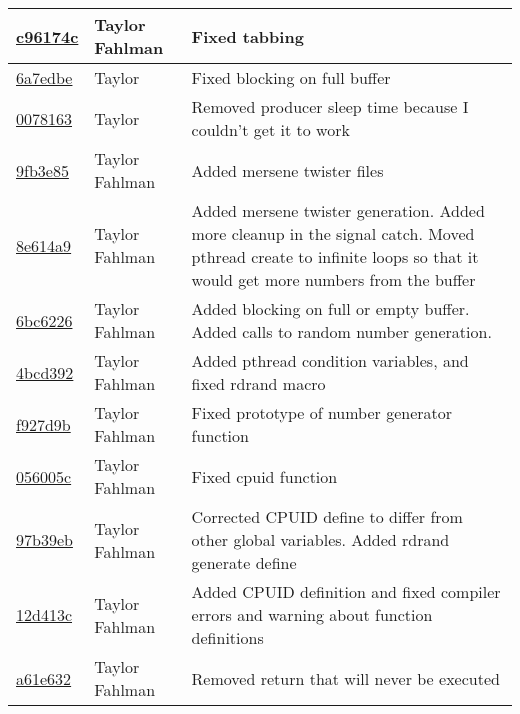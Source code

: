 \begin{tabular}{l l l}
\href{git@github.com:fahlmant/cs444/commit/c96174c136e9194fd83f4d5fee5927432468fdfd}{c96174c} & Taylor Fahlman & Fixed tabbing\\\hline
\href{git@github.com:fahlmant/cs444/commit/6a7edbe421fb5e53a9a847a09117500c1ca1482e}{6a7edbe} & Taylor & Fixed blocking on full buffer\\\hline
\href{git@github.com:fahlmant/cs444/commit/007816390983ac7d562e8f9d4d31ff6abc7c40c8}{0078163} & Taylor & Removed producer sleep time because I couldn't get it to work\\\hline
\href{git@github.com:fahlmant/cs444/commit/9fb3e850a20f58cd174a80bf580c150ebb8a8860}{9fb3e85} & Taylor Fahlman & Added mersene twister files\\\hline
\href{git@github.com:fahlmant/cs444/commit/8e614a90d9b3adfedea1214253801c36f17c6aea}{8e614a9} & Taylor Fahlman & Added mersene twister generation. Added more cleanup in the signal catch. Moved pthread create to infinite loops so that it would get more numbers from the buffer\\\hline
\href{git@github.com:fahlmant/cs444/commit/6bc6226e01a9a1302c741331cce8ab8256f399ce}{6bc6226} & Taylor Fahlman & Added blocking on full or empty buffer. Added calls to random number generation.\\\hline
\href{git@github.com:fahlmant/cs444/commit/4bcd392bf2941eb49cc82229be9495cd4c9f62ee}{4bcd392} & Taylor Fahlman & Added pthread condition variables, and fixed rdrand macro\\\hline
\href{git@github.com:fahlmant/cs444/commit/f927d9b39907620e959c235c9b56ab0160bbc366}{f927d9b} & Taylor Fahlman & Fixed prototype of number generator function\\\hline
\href{git@github.com:fahlmant/cs444/commit/056005ccb725e1ce91c211bb5cc71acdd3cfe5e4}{056005c} & Taylor Fahlman & Fixed cpuid function\\\hline
\href{git@github.com:fahlmant/cs444/commit/97b39ebde5ea4090c9371d7868ec9984c6230703}{97b39eb} & Taylor Fahlman & Corrected CPUID define to differ from other global variables. Added rdrand generate define\\\hline
\href{git@github.com:fahlmant/cs444/commit/12d413cdbc773bea9797fbc8ffc523df368cae5c}{12d413c} & Taylor Fahlman & Added CPUID definition and fixed compiler errors and warning about function definitions\\\hline
\href{git@github.com:fahlmant/cs444/commit/a61e6320173be1ea668966396bb45bc7930d34f9}{a61e632} & Taylor Fahlman & Removed return that will never be executed\\\hline

\end{tabular}
